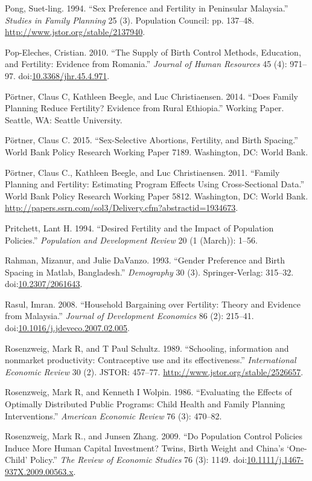 \documentclass[]{article}
\begin{document}
Pong, Suet-ling. 1994. ``Sex Preference and Fertility in Peninsular Malaysia.'' \emph{Studies in Family Planning} 25 (3). Population Council: pp. 137--48. \url{http://www.jstor.org/stable/2137940}.

Pop-Eleches, Cristian. 2010. ``The Supply of Birth Control Methods, Education, and Fertility: Evidence from Romania.'' \emph{Journal of Human Resources} 45 (4): 971--97. doi:\href{https://doi.org/10.3368/jhr.45.4.971}{10.3368/jhr.45.4.971}.

Pörtner, Claus C, Kathleen Beegle, and Luc Christiaensen. 2014. ``Does Family Planning Reduce Fertility? Evidence from Rural Ethiopia.'' Working Paper. Seattle, WA: Seattle University.

Pörtner, Claus C. 2015. ``Sex-Selective Abortions, Fertility, and Birth Spacing.'' World Bank Policy Research Working Paper 7189. Washington, DC: World Bank.

Pörtner, Claus C., Kathleen Beegle, and Luc Christiaensen. 2011. ``Family Planning and Fertility: Estimating Program Effects Using Cross-Sectional Data.'' World Bank Policy Research Working Paper 5812. Washington, DC: World Bank. \url{http://papers.ssrn.com/sol3/Delivery.cfm?abstractid=1934673}.

Pritchett, Lant H. 1994. ``Desired Fertility and the Impact of Population Policies.'' \emph{Population and Development Review} 20 (1 (March)): 1--56.

Rahman, Mizanur, and Julie DaVanzo. 1993. ``Gender Preference and Birth Spacing in Matlab, Bangladesh.'' \emph{Demography} 30 (3). Springer-Verlag: 315--32. doi:\href{https://doi.org/10.2307/2061643}{10.2307/2061643}.

Rasul, Imran. 2008. ``Household Bargaining over Fertility: Theory and Evidence from Malaysia.'' \emph{Journal of Development Economics} 86 (2): 215--41. doi:\href{https://doi.org/10.1016/j.jdeveco.2007.02.005}{10.1016/j.jdeveco.2007.02.005}.

Rosenzweig, Mark R, and T Paul Schultz. 1989. ``Schooling, information and nonmarket productivity: Contraceptive use and its effectiveness.'' \emph{International Economic Review} 30 (2). JSTOR: 457--77. \url{http://www.jstor.org/stable/2526657}.

Rosenzweig, Mark R, and Kenneth I Wolpin. 1986. ``Evaluating the Effects of Optimally Distributed Public Programs: Child Health and Family Planning Interventions.'' \emph{American Economic Review} 76 (3): 470--82.

Rosenzweig, Mark R., and Junsen Zhang. 2009. ``Do Population Control Policies Induce More Human Capital Investment? Twins, Birth Weight and China's `One-Child' Policy.'' \emph{The Review of Economic Studies} 76 (3): 1149. doi:\href{https://doi.org/10.1111/j.1467-937X.2009.00563.x}{10.1111/j.1467-937X.2009.00563.x}.
\end{document}

